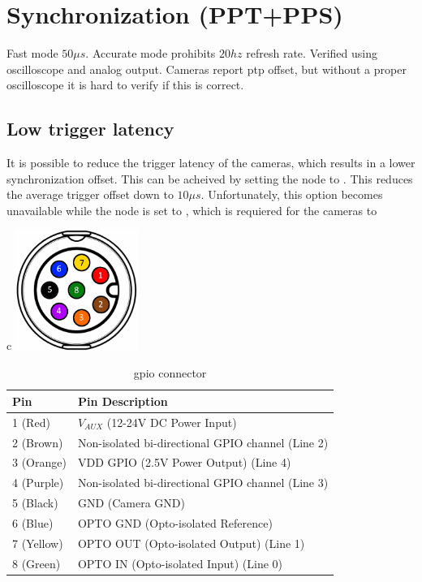 \section{Synchronization (PPT+PPS)}
Fast mode \approx $50\mu s$. Accurate mode prohibits $20hz$ refresh rate.
Verified using oscilloscope and analog output.
Cameras report ptp offset, but without a proper oscilloscope it is hard to verify if this is correct.

\subsection{Low trigger latency}
It is possible to reduce the trigger latency of the cameras, which results in a lower synchronization offset.
This can be acheived by setting the  node to .
This reduces the average trigger offset down to $10\mu s$.
Unfortunately, this option becomes unavailable while the  node is set to , which is requiered for the cameras to


\begin{table}[H]
    \centering
    \begin{tabular}{c}
        \includegraphics[width=0.3\textwidth]{figures/m8-pin-layout.png}
        \\
        \small
        \begin{tabular}{ |l|l| }
            \hline
            \textbf{Pin} & \textbf{Pin Description}                          \\
            \hline
            1 (Red)      & $V_{AUX}$ (12-24V DC Power Input)                 \\
            2 (Brown)    & Non-isolated bi-directional GPIO channel (Line 2) \\
            3 (Orange)   & VDD GPIO (2.5V Power Output) (Line 4)             \\
            4 (Purple)   & Non-isolated bi-directional GPIO channel (Line 3) \\
            5 (Black)    & GND (Camera GND)                                  \\
            6 (Blue)     & OPTO GND (Opto-isolated Reference)                \\
            7 (Yellow)   & OPTO OUT (Opto-isolated Output) (Line 1)          \\
            8 (Green)    & OPTO IN (Opto-isolated Input) (Line 0)            \\
            \hline
        \end{tabular}
    \end{tabular}
    \caption{\cam \gls{gpio} connector \cite{lucidvisionlabsTritonMPPolarized2020}}

\end{table}


